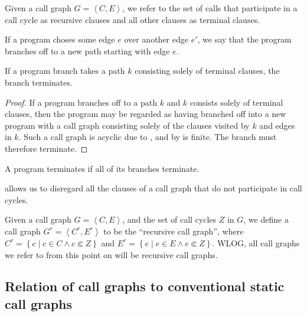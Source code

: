 \begin{definition}\label{definition:recursive-terminal} Given a call graph $G =
\left\langle C,E \right\rangle$, we refer to the set of calls that participate
in a call cycle as recursive clauses and all other clauses as terminal
clauses.\end{definition}

\begin{definition} If a program choses some edge $e$ over another edge $e'$, we
say that the program branches off to a new path starting with edge
$e$.\end{definition}

\begin{theorem} If a program branch takes a path $k$ consisting solely of
terminal clauses, the branch terminates.\end{theorem}

\begin{proof} If a program branches off to a path $k$ and $k$ consists solely
of terminal clauses, then the program may be regarded as having branched off
into a new program with a call graph consisting solely of the clauses visited
by $k$ and edges in $k$. Such a call graph is acyclic due to
, and by
 is finite. The branch must therefore
terminate.\end{proof}

\begin{corollary}\label{corollary:program-branch-terminate} A program
terminates if all of its branches terminate.\end{corollary}

 allows us to disregard all the
clauses of a call graph that do not participate in call cycles.

\begin{definition} Given a call graph $G=\left\langle C, E \right\rangle$, and
the set of call cycles $Z$ in $G$, we define a call graph $G^r=\left\langle
C^r, E^r\right\rangle$ to be the ``recursive call graph'', where $C^r=\left\{ c
\mid c\in C \wedge c\Subset Z \right\}$ and $E^r = \left\{ e \mid e\in E \wedge
e\Subset Z \right\}$. WLOG, all call graphs we refer to from this point on will
be recursive call graphs.\end{definition}

\subsection{Relation of call graphs to conventional static call graphs}

